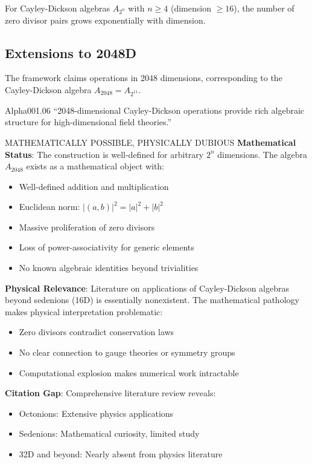 \begin{theorem}
For Cayley-Dickson algebras $A_{2^n}$ with $n \geq 4$ (dimension $\geq 16$), the number of zero divisor pairs grows exponentially with dimension.
\end{theorem}

\subsection{Extensions to 2048D}

The framework claims operations in 2048 dimensions, corresponding to the Cayley-Dickson algebra $A_{2048} = A_{2^{11}}$.

\begin{frameworkclaim}{Alpha001.06}
``2048-dimensional Cayley-Dickson operations provide rich algebraic structure for high-dimensional field theories.''
\end{frameworkclaim}

\begin{factcheck}{MATHEMATICALLY POSSIBLE, PHYSICALLY DUBIOUS}
\textbf{Mathematical Status}: The construction is well-defined for arbitrary $2^n$ dimensions. The algebra $A_{2048}$ exists as a mathematical object with:
\begin{itemize}
    \item[+] Well-defined addition and multiplication
    \item[+] Euclidean norm: $|(a,b)|^2 = |a|^2 + |b|^2$
    \item[$-$] Massive proliferation of zero divisors
    \item[$-$] Loss of power-associativity for generic elements
    \item[$-$] No known algebraic identities beyond trivialities
\end{itemize}

\textbf{Physical Relevance}: Literature on applications of Cayley-Dickson algebras beyond sedenions (16D) is essentially nonexistent. The mathematical pathology makes physical interpretation problematic:
\begin{itemize}
    \item Zero divisors contradict conservation laws
    \item No clear connection to gauge theories or symmetry groups
    \item Computational explosion makes numerical work intractable
\end{itemize}

\textbf{Citation Gap}: Comprehensive literature review reveals:
\begin{itemize}
    \item Octonions: Extensive physics applications \cite{baez2001octonions, dixon1994octonions}
    \item Sedenions: Mathematical curiosity, limited study \cite{cawagas2004sedenions}
    \item 32D and beyond: Nearly absent from physics literature
\end{itemize}
\end{factcheck}

